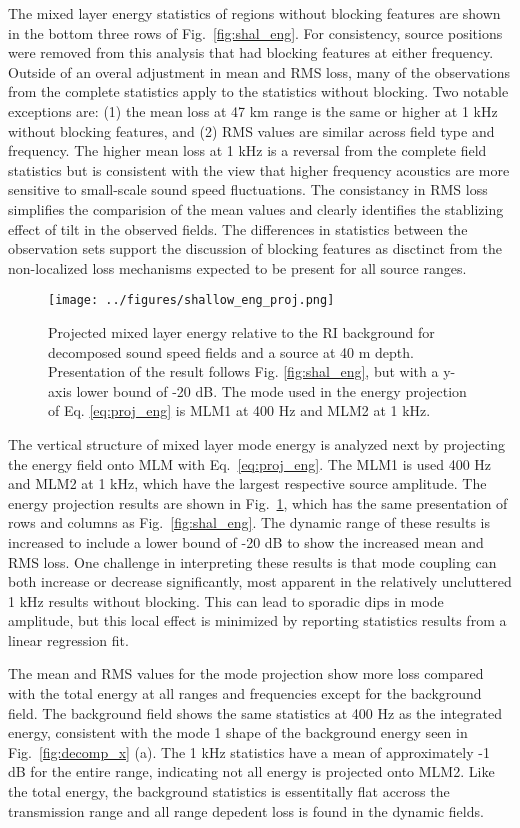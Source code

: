 \documentclass[preprint,NumberedRefs]{JASA}
\begin{document}
The mixed layer energy statistics of regions without blocking features are shown in the bottom three rows of Fig.~\ref{fig:shal_eng}. For consistency, source positions were removed from this analysis that had blocking features at either frequency. Outside of an overal adjustment in mean and RMS loss, many of the observations from the complete statistics apply to the statistics without blocking. Two notable exceptions are: (1) the mean loss at 47 km range is the same or higher at 1 kHz without blocking features, and (2) RMS values are similar across field type and frequency. The higher mean loss at 1 kHz is a reversal from the complete field statistics but is consistent with the view that higher frequency acoustics are more sensitive to small-scale sound speed fluctuations. The consistancy in RMS loss simplifies the comparision of the mean values and clearly identifies the stablizing effect of tilt in the observed fields. The differences in statistics between the observation sets support the discussion of blocking features as disctinct from the non-localized loss mechanisms expected to be present for all source ranges.

\begin{figure}
\texttt{[image: ../figures/shallow\_eng\_proj.png]}
    \caption{Projected mixed layer energy relative to the RI background for decomposed sound speed fields and a source at 40 m depth. Presentation of the result follows Fig. \ref{fig:shal_eng}, but with a y-axis lower bound of -20 dB. The mode used in the energy projection of Eq. \eqref{eq:proj_eng} is MLM1 at 400 Hz and MLM2 at 1 kHz.}
    \label{fig:shal_proj}
\end{figure}
The vertical structure of mixed layer mode energy is analyzed next by projecting the energy field onto MLM with Eq.~\eqref{eq:proj_eng}. The MLM1 is used 400 Hz and MLM2 at 1 kHz, which have the largest respective source amplitude. The energy projection results are shown in Fig.~\ref{fig:shal_proj}, which has the same presentation of rows and columns as Fig.~\ref{fig:shal_eng}. The dynamic range of these results is increased to include a lower bound of -20 dB to show the increased mean and RMS loss. One challenge in interpreting these results is that mode coupling can both increase or decrease significantly, most apparent in the relatively uncluttered 1 kHz results without blocking. This can lead to sporadic dips in mode amplitude, but this local effect is minimized by reporting statistics results from a linear regression fit.

The mean and RMS values for the mode projection show more loss compared with the total energy at all ranges and frequencies except for the background field. The background field shows the same statistics at 400 Hz as the integrated energy, consistent with the mode 1 shape of the background energy seen in Fig.~\ref{fig:decomp_x} (a). The 1 kHz statistics have a mean of approximately -1 dB for the entire range, indicating not all energy is projected onto MLM2. Like the total energy, the background statistics is essentitally flat accross the transmission range and all range depedent loss is found in the dynamic fields.
\end{document}
